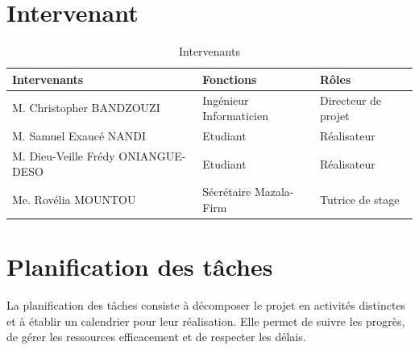 \section{Intervenant}

\begin{table}[htbp]
  \centering
  \begin{tabularx}{\textwidth}{|l|l|X|}
    \hline
    \textbf{Intervenants} & \textbf{Fonctions} & \textbf{Rôles} \\ \hline
    M. Christopher BANDZOUZI & Ingénieur Informaticien & Directeur de projet  \\ \hline
    M. Samuel Exaucé NANDI & Etudiant & Réalisateur \\ \hline
    M. Dieu-Veille Frédy ONIANGUE-DESO & Etudiant & Réalisateur \\ \hline
    Me. Rovélia MOUNTOU & Sécrétaire Mazala-Firm & Tutrice de stage \\ \hline
  \end{tabularx}
  \caption{Intervenants}
\end{table}

\section{Planification des tâches}
La planification des tâches consiste à décomposer le projet en activités
distinctes et à établir un calendrier pour leur réalisation. Elle permet de
suivre les progrès, de gérer les ressources efficacement et de
respecter les délais.

